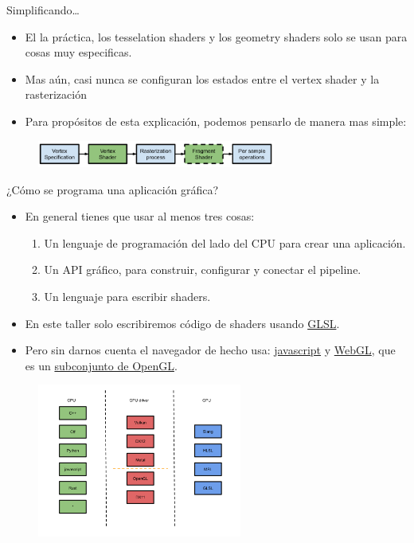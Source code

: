 \begin{frame}{Simplificando\ldots}
\begin{itemize}
    \item El la práctica, los tesselation shaders y los geometry shaders solo se usan para cosas muy especificas.
    \item Mas aún, casi nunca se configuran los estados entre el vertex shader y la rasterización
    \item Para propósitos de esta explicación, podemos pensarlo de manera mas simple:    
\end{itemize}
\begin{figure}[htb]
  \centering
  \includegraphics[width=0.7\textwidth]{img/SimplifiedPipeline}
\end{figure}
\end{frame}

\begin{frame}[allowframebreaks]{¿Cómo se programa una aplicación gráfica?}
\begin{itemize}
    \item En general tienes que usar al menos tres cosas:
    \begin{enumerate}
        \item Un lenguaje de programación del lado del CPU para crear una aplicación.
        \item Un API gráfico, para construir, configurar y conectar el pipeline.
        \item Un lenguaje para escribir shaders.
    \end{enumerate}
    \item En este taller solo escribiremos código de shaders usando \href{https://www.khronos.org/opengl/wiki/OpenGL_Shading_Language}{GLSL}.
    \item Pero sin darnos cuenta el navegador de hecho usa: \href{https://en.wikipedia.org/wiki/JavaScript}{javascript} y \href{https://www.khronos.org/webgl/}{WebGL}, que es un \href{https://www.khronos.org/opengles/}{subconjunto de OpenGL}.
\end{itemize}
\begin{figure}[htb]
  \centering
  \includegraphics[width=0.6\textwidth]{img/APIs}
\end{figure}
\end{frame}

